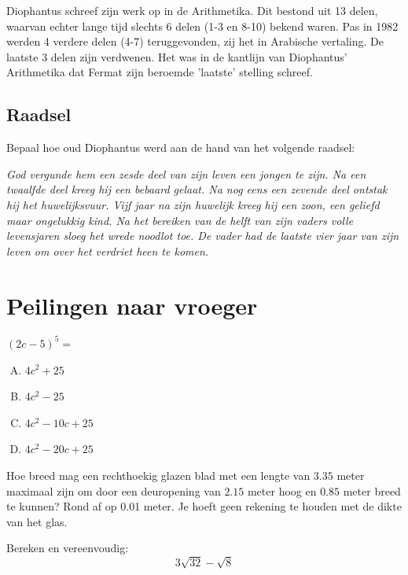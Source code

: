 \documentclass[12pt]{article}
\begin{document}
Diophantus schreef zijn werk op in de Arithmetika. Dit bestond uit 13 delen, waarvan echter lange tijd slechts 6 delen (1-3 en 8-10) bekend waren. Pas in 1982 werden 4 verdere delen (4-7) teruggevonden, zij het in Arabische vertaling. De laatste 3 delen zijn verdwenen. Het was in de kantlijn van Diophantus' Arithmetika dat Fermat zijn beroemde 'laatste' stelling schreef.

\subsection*{Raadsel}

Bepaal hoe oud Diophantus werd aan de hand van het volgende raadsel:

{\em God vergunde hem een zesde deel van zijn leven een jongen te zijn. Na een twaalfde deel kreeg hij een bebaard gelaat. Na nog eens een zevende deel ontstak hij het huwelijksvuur. Vijf jaar na zijn huwelijk kreeg hij een zoon, een geliefd maar ongelukkig kind. Na het bereiken van de helft van zijn vaders volle levensjaren sloeg het wrede noodlot toe. De vader had de laatste vier jaar van zijn leven om over het verdriet heen te komen. }

\section*{Peilingen naar vroeger}

\begin{oefening}
$(2c-5)^5=$
\begin{center}
\begin{enumerate}[(A)]
  \item $4c^2+25$
  \item $4c^2-25$
  \item $4c^2-10c+25$
  \item $4c^2-20c+25$
\end{enumerate}
\end{center}
\end{oefening}

\begin{oefening}
Hoe breed mag een rechthoekig glazen blad met een lengte van $3.35$ meter maximaal zijn om door een deuropening van $2.15$ meter hoog en $0.85$ meter breed te kunnen? Rond af op 0.01 meter. Je hoeft geen rekening te houden met de dikte van het glas.
\end{oefening}

\begin{oefening}
Bereken en vereenvoudig: $$3\sqrt{32}-\sqrt{8}$$
\end{oefening}
\end{document}
